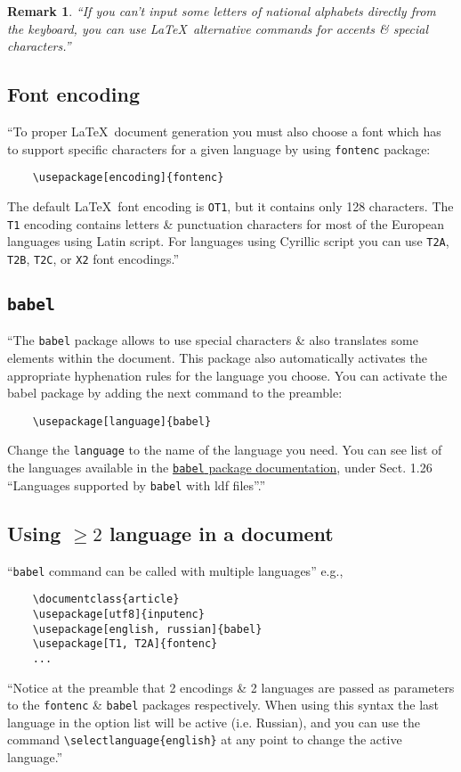 \documentclass{article}
\numberwithin{equation}{section}
\newtheorem{remark}{Remark}[section]
\begin{document}
\begin{remark}
	``If you can't input some letters of national alphabets directly from the keyboard, you can use \LaTeX\ alternative commands for accents \& special characters.''
\end{remark}

\subsection{Font encoding}
``To proper \LaTeX\ document generation you must also choose a font which has to support specific characters for a given language by using \texttt{fontenc} package:
\begin{verbatim}
	\usepackage[encoding]{fontenc}
\end{verbatim}
The default \LaTeX\ font encoding is \texttt{OT1}, but it contains only 128 characters. The \texttt{T1} encoding contains letters \& punctuation characters for most of the European languages using Latin script. For languages using Cyrillic script you can use \texttt{T2A}, \texttt{T2B}, \texttt{T2C}, or \texttt{X2} font encodings.''

\subsection{\texttt{babel}}
``The \texttt{babel} package allows to use special characters \& also translates some elements within the document. This package also automatically activates the appropriate hyphenation rules for the language you choose. You can activate the babel package by adding the next command to the preamble:
\begin{verbatim}
	\usepackage[language]{babel}
\end{verbatim}
Change the \texttt{language} to the name of the language you need. You can see list of the languages available in the \href{http://texdoc.net/pkg/babel}{\texttt{babel} package documentation}, under Sect. 1.26 ``Languages supported by \texttt{babel} with ldf files''.'' 

\subsection{Using $\ge 2$ language in a document}
``\texttt{babel} command can be called with multiple languages'' e.g.,
\begin{verbatim}
	\documentclass{article}
	\usepackage[utf8]{inputenc}
	\usepackage[english, russian]{babel}
	\usepackage[T1, T2A]{fontenc}
	...
\end{verbatim}
``Notice at the preamble that 2 encodings \& 2 languages are passed as parameters to the \texttt{fontenc} \& \texttt{babel} packages respectively. When using this syntax the last language in the option list will be active (i.e. Russian), and you can use the command \verb|\selectlanguage{english}| at any point to change the active language.''
\end{document}
